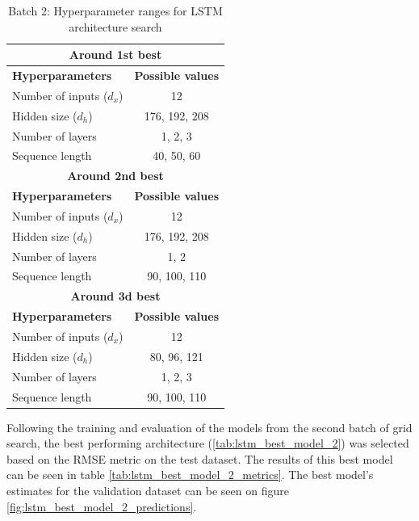 \FloatBarrier
\begin{table}[h]
    \centering
    \begin{tabular}{|l|c|}
        \hline
        \multicolumn{2}{|c|}{\textbf{Around 1st best}} \\
        \hline
        \textbf{Hyperparameters} & \textbf{Possible values} \\
        \hline
        Number of inputs ($d_x$) & 12 \\
        \hline
        Hidden size ($d_h$) & 176, 192, 208 \\
        \hline
        Number of layers & 1, 2, 3 \\
        \hline
        Sequence length & 40, 50, 60 \\
        \hline \hline
        \multicolumn{2}{|c|}{\textbf{Around 2nd best}} \\
        \hline
        \textbf{Hyperparameters} & \textbf{Possible values} \\
        \hline
        Number of inputs ($d_x$) & 12 \\
        \hline
        Hidden size ($d_h$) & 176, 192, 208 \\
        \hline
        Number of layers & 1, 2 \\
        \hline
        Sequence length & 90, 100, 110 \\
        \hline
        \multicolumn{2}{|c|}{\textbf{Around 3d best}} \\
        \hline \hline
        \textbf{Hyperparameters} & \textbf{Possible values} \\
        \hline
        Number of inputs ($d_x$) & 12 \\
        \hline
        Hidden size ($d_h$) & 80, 96, 121 \\
        \hline
        Number of layers & 1, 2, 3 \\
        \hline
        Sequence length & 90, 100, 110 \\
        \hline
    \end{tabular}
    \caption{Batch 2: Hyperparameter ranges for LSTM architecture search}
    \label{tab:lstm_hyperparams_2}
\end{table}
\FloatBarrier

Following the training and evaluation of the models from the second batch of grid search, the best performing architecture (\ref{tab:lstm_best_model_2}) was selected based on the RMSE metric on the test dataset. The results of this best model can be seen in table \ref{tab:lstm_best_model_2_metrics}. The best model's estimates for the validation dataset can be seen on figure \ref{fig:lstm_best_model_2_predictions}.

